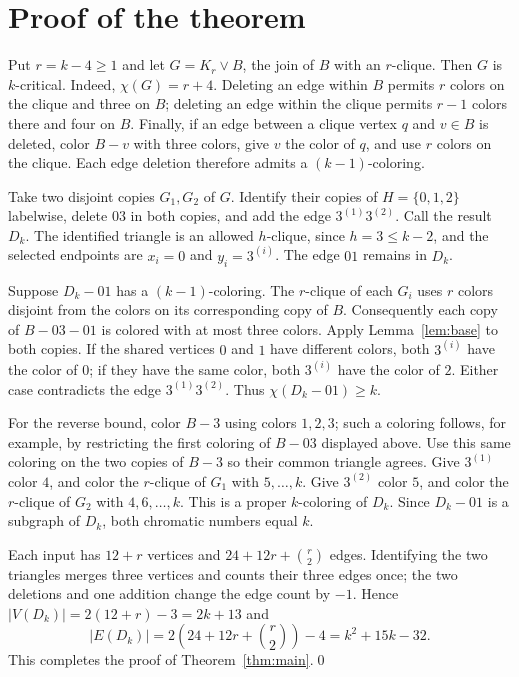\documentclass[11pt]{article}
\newcommand{\chiG}{\chi}
\begin{document}
\section{Proof of the theorem}
Put $r=k-4\geq1$ and let $G=K_r\vee B$, the join of $B$ with an $r$-clique. Then $G$ is $k$-critical. Indeed, $\chiG(G)=r+4$. Deleting an edge within $B$ permits $r$ colors on the clique and three on $B$; deleting an edge within the clique permits $r-1$ colors there and four on $B$. Finally, if an edge between a clique vertex $q$ and $v\in B$ is deleted, color $B-v$ with three colors, give $v$ the color of $q$, and use $r$ colors on the clique. Each edge deletion therefore admits a $(k-1)$-coloring.

Take two disjoint copies $G_1,G_2$ of $G$. Identify their copies of $H=\{0,1,2\}$ labelwise, delete $03$ in both copies, and add the edge $3^{(1)}3^{(2)}$. Call the result $D_k$. The identified triangle is an allowed $h$-clique, since $h=3\leq k-2$, and the selected endpoints are $x_i=0$ and $y_i=3^{(i)}$. The edge $01$ remains in $D_k$.

Suppose $D_k-01$ has a $(k-1)$-coloring. The $r$-clique of each $G_i$ uses $r$ colors disjoint from the colors on its corresponding copy of $B$. Consequently each copy of $B-03-01$ is colored with at most three colors. Apply Lemma~\ref{lem:base} to both copies. If the shared vertices $0$ and $1$ have different colors, both $3^{(i)}$ have the color of $0$; if they have the same color, both $3^{(i)}$ have the color of $2$. Either case contradicts the edge $3^{(1)}3^{(2)}$. Thus $\chiG(D_k-01)\geq k$.

For the reverse bound, color $B-3$ using colors $1,2,3$; such a coloring follows, for example, by restricting the first coloring of $B-03$ displayed above. Use this same coloring on the two copies of $B-3$ so their common triangle agrees. Give $3^{(1)}$ color $4$, and color the $r$-clique of $G_1$ with $5,\ldots,k$. Give $3^{(2)}$ color $5$, and color the $r$-clique of $G_2$ with $4,6,\ldots,k$. This is a proper $k$-coloring of $D_k$. Since $D_k-01$ is a subgraph of $D_k$, both chromatic numbers equal $k$.

Each input has $12+r$ vertices and $24+12r+\binom r2$ edges. Identifying the two triangles merges three vertices and counts their three edges once; the two deletions and one addition change the edge count by $-1$. Hence $|V(D_k)|=2(12+r)-3=2k+13$ and
\[
|E(D_k)|=2\left(24+12r+\binom r2\right)-4=k^2+15k-32.
\]
This completes the proof of Theorem~\ref{thm:main}.\qed
\end{document}
